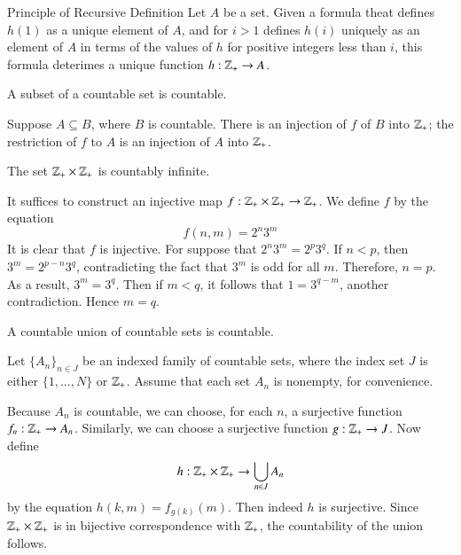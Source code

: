 \documentclass[12pt, a4paper, twoside, openright, titlepage]{book}
\begin{document}
\begin{appendices}
    \begin{cust*}[separator sign={}separator sign={}]{Principle of Recursive Definition}{}
        Let $A$ be a set. Given a formula theat defines $h(1)$ as a unique element of $A$, and for $i > 1$ defines $h(i)$ uniquely as an element of $A$ in terms of the values of $h$ for positive integers less than $i$, this formula deterimes a unique function $h:\mathbb Z_+\rightarrow A$.
    \end{cust*}


    \begin{cor}{}{}
        A subset of a countable set is countable.
    \end{cor}
    \begin{proof*}{}{}
        Suppose $A \subseteq B$, where $B$ is countable. There is an injection of $f$ of $B$ into $\mathbb Z_+$; the restriction of $f$ to $A$ is an injection of $A$ into $\mathbb Z_+$.
    \end{proof*}


    \begin{cor}{}{}
        The set $\mathbb Z_+\times \mathbb Z_+$ is countably infinite.
    \end{cor}
    \begin{proof*}{}{}
        It suffices to construct an injective map $f:\mathbb Z_+\times \mathbb Z_+\rightarrow \mathbb Z_+$. We define $f$ by the equation $$f(n,m) = 2^n3^m$$ It is clear that $f$ is injective. For suppose that $2^n3^m = 2^p3^q$. If $n < p$, then $3^m = 2^{p-n}3^q$, contradicting the fact that $3^m$ is odd for all $m$. Therefore, $n = p$. As a result, $3^m = 3^q$. Then if $m < q$, it follows that $1 = 3^{q-m}$, another contradiction. Hence $m = q$.
    \end{proof*}


    \begin{thm}{}{}
        A countable union of countable sets is countable.
    \end{thm}
    \begin{proof*}{}{}
        Let $\{A_n\}_{n\in J}$ be an indexed family of countable sets, where the index set $J$ is either $\{1,...,N\}$ or $\mathbb Z_+$. Assume that each set $A_n$ is nonempty, for convenience.

        Because $A_n$ is countable, we can choose, for each $n$, a surjective function $f_n:\mathbb Z_+\rightarrow A_n$. Similarly, we can choose a surjective function $g:\mathbb Z_+\rightarrow J$. Now define \begin{equation*}
            h:\mathbb Z_+\times \mathbb Z_+\rightarrow \bigcup\limits_{n\in J}A_n
        \end{equation*}
        by the equation $h(k,m) = f_{g(k)}(m)$. Then indeed $h$ is surjective. Since $\mathbb Z_+\times\mathbb Z_+$ is in bijective correspondence with $\mathbb Z_+$, the countability of the union follows.
    \end{proof*}


\end{appendices}
\end{document}
